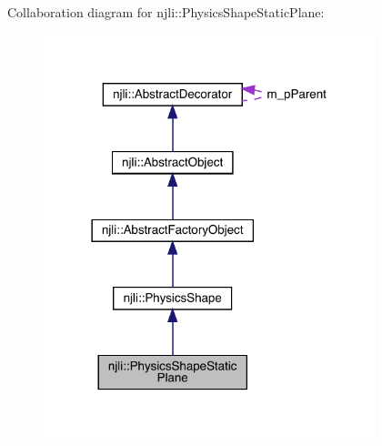 Collaboration diagram for njli\+:\+:Physics\+Shape\+Static\+Plane\+:\nopagebreak
\begin{figure}[H]
\begin{center}
\leavevmode
\includegraphics[width=273pt]{classnjli_1_1_physics_shape_static_plane__coll__graph}
\end{center}
\end{figure}
